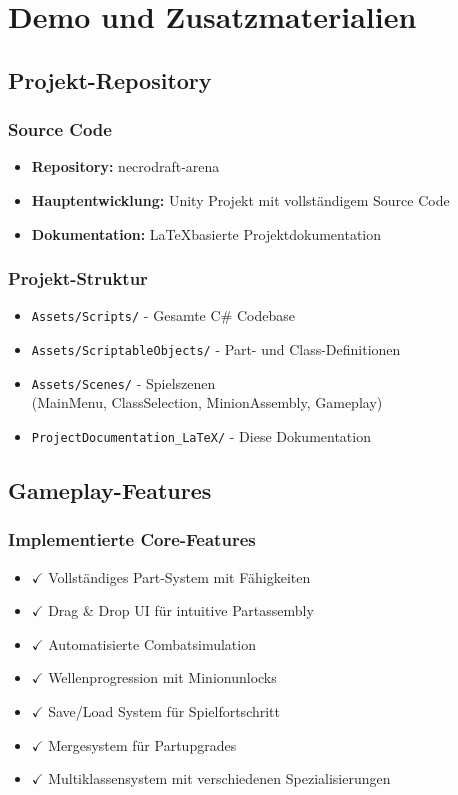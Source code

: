 \chapter{Demo und Zusatzmaterialien}
\label{chap:demo}

\section{Projekt-Repository}

\subsection{Source Code}
\begin{itemize}
    \item \textbf{Repository:} necrodraft-arena
    \item \textbf{Hauptentwicklung:} Unity Projekt mit vollständigem Source Code
    \item \textbf{Dokumentation:} LaTeXbasierte Projektdokumentation
\end{itemize}

\subsection{Projekt-Struktur}
\begin{itemize}
    \item \texttt{Assets/Scripts/} - Gesamte C\# Codebase
    \item \texttt{Assets/ScriptableObjects/} - Part- und Class-Definitionen  
    \item \texttt{Assets/Scenes/} - Spielszenen \\
          (MainMenu, ClassSelection, MinionAssembly, Gameplay)
    \item \texttt{ProjectDocumentation\_LaTeX/} - Diese Dokumentation
\end{itemize}

\section{Gameplay-Features}

\subsection{Implementierte Core-Features}
\begin{itemize}
    \item $\checkmark$ Vollständiges Part-System mit Fähigkeiten
    \item $\checkmark$ Drag \& Drop UI für intuitive Partassembly
    \item $\checkmark$ Automatisierte Combatsimulation
    \item $\checkmark$ Wellenprogression mit Minionunlocks
    \item $\checkmark$ Save/Load System für Spielfortschritt
    \item $\checkmark$ Mergesystem für Partupgrades
    \item $\checkmark$ Multiklassensystem mit verschiedenen Spezialisierungen
\end{itemize}

